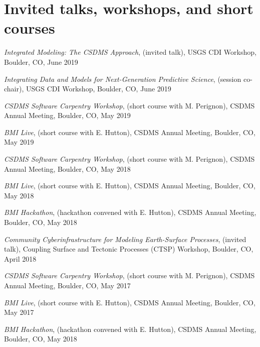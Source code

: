 \section{Invited talks, workshops, and short courses}
\vspace{0.5em}

\begin{enumerate}[{[}1{]}]

  \item \textit{Integrated Modeling: The CSDMS Approach}, (invited
    talk), USGS CDI Workshop, Boulder, CO, June 2019

  \item \textit{Integrating Data and Models for Next-Generation
    Predictive Science}, (session co-chair), USGS CDI Workshop,
    Boulder, CO, June 2019
    
  \item \textit{CSDMS Software Carpentry Workshop}, (short course with
    M. Perignon), CSDMS Annual Meeting, Boulder, CO, May 2019

  \item \textit{BMI Live}, (short course with E. Hutton),
    CSDMS Annual Meeting, Boulder, CO, May 2019

  \item \textit{CSDMS Software Carpentry Workshop}, (short course with
    M. Perignon), CSDMS Annual Meeting, Boulder, CO, May 2018

  \item \textit{BMI Live}, (short course with E. Hutton),
    CSDMS Annual Meeting, Boulder, CO, May 2018

  \item \textit{BMI Hackathon}, (hackathon convened with E. Hutton),
    CSDMS Annual Meeting, Boulder, CO, May 2018

  \item \textit{Community Cyberinfrastructure for Modeling
    Earth-Surface Processes}, (invited talk), Coupling Surface and
    Tectonic Processes (CTSP) Workshop, Boulder, CO, April 2018

  \item \textit{CSDMS Software Carpentry Workshop}, (short course with
    M. Perignon), CSDMS Annual Meeting, Boulder, CO, May 2017

  \item \textit{BMI Live}, (short course with E. Hutton),
    CSDMS Annual Meeting, Boulder, CO, May 2017

  \item \textit{BMI Hackathon}, (hackathon convened with E. Hutton),
    CSDMS Annual Meeting, Boulder, CO, May 2018


\end{enumerate}
